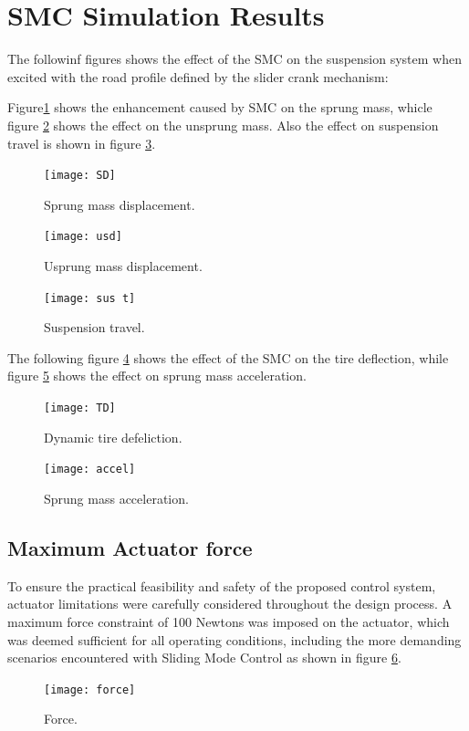 \newpage
\section{SMC Simulation Results}
The followinf figures shows the effect of the SMC on the suspension system when excited with the road profile defined by the slider crank mechanism:

Figure\ref{fig:smc1} shows the enhancement caused by SMC on the sprung mass, whicle figure  \ref{fig:smc2} shows the effect on the unsprung mass. Also the effect on suspension travel is shown in figure \ref{fig:smc3}.
\begin{figure}[H]
	\centering
	\texttt{[image: SD]}
	\caption{Sprung mass displacement. }
	\label{fig:smc1}
\end{figure}

\begin{figure}[H]
	\centering
	\texttt{[image: usd]}
	\caption{Usprung mass displacement. }
	\label{fig:smc2}
\end{figure}

\begin{figure}[H]
	\centering
	\texttt{[image: sus t]}
	\caption{Suspension travel. }
	\label{fig:smc3}
\end{figure}


\newpage
The following figure \ref{fig:smc4} shows the effect of the SMC on the tire deflection, while figure \ref{fig:smc5} shows the effect on sprung mass acceleration.

\begin{figure}[H]
	\centering
	\texttt{[image: TD]}
	\caption{Dynamic tire defeliction. }
	\label{fig:smc4}
\end{figure}

\begin{figure}[H]
	\centering
	\texttt{[image: accel]}
	\caption{Sprung mass acceleration. }
	\label{fig:smc5}
\end{figure}

\subsection{Maximum Actuator force}
To ensure the practical feasibility and safety of the proposed control system, actuator limitations were carefully considered throughout the design process. A maximum force constraint of 100 Newtons was imposed on the actuator, which was deemed sufficient for all operating conditions, including the more demanding scenarios encountered with Sliding Mode Control as shown in figure \ref{fig:smc6}. 
\begin{figure}[H]
	\centering
	\texttt{[image: force]}
	\caption{Force. }
	\label{fig:smc6}
\end{figure}



